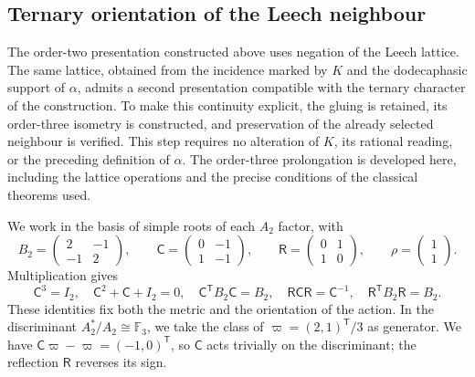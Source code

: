 
\subsection{Ternary orientation of the Leech neighbour}
\label{km:orden-tres-reticular}

The order-two presentation constructed above uses negation
of the Leech lattice. The same lattice, obtained from the incidence marked
by \(K\) and the dodecaphasic support of \(\alpha\), admits a second
presentation compatible with the ternary character of the construction.
To make this continuity explicit, the gluing is retained, its order-three
isometry is constructed, and preservation of the already selected neighbour
is verified. This step requires no alteration of \(K\), its rational reading,
or the preceding definition of \(\alpha\). The order-three prolongation is developed here,
including the lattice operations and the precise conditions of the classical
theorems used.

We work in the basis of simple roots of each \(A_2\) factor, with
\begin{equation}
 B_2=\begin{pmatrix}2&-1\\-1&2\end{pmatrix},\qquad
 \mathsf C=\begin{pmatrix}0&-1\\1&-1\end{pmatrix},\qquad
 \mathsf R=\begin{pmatrix}0&1\\1&0\end{pmatrix},\qquad
 \rho=\begin{pmatrix}1\\1\end{pmatrix}.
 \label{km:coxeter-reflexion}
\end{equation}
Multiplication gives
\[
 \mathsf C^3=I_2,\quad
 \mathsf C^2+\mathsf C+I_2=0,\quad
 \mathsf C^{\mathsf T}B_2\mathsf C=B_2,\quad
 \mathsf R\mathsf C\mathsf R=\mathsf C^{-1},\quad
 \mathsf R^{\mathsf T}B_2\mathsf R=B_2.
\]
These identities fix both the metric and the orientation of the action.
In the discriminant \(A_2^*/A_2\cong\mathbb F_3\), we take
the class of \(\varpi=(2,1)^{\mathsf T}/3\) as generator. We have
\(\mathsf C\varpi-\varpi=(-1,0)^{\mathsf T}\), so
\(\mathsf C\) acts trivially on the discriminant; the reflection
\(\mathsf R\) reverses its sign.

